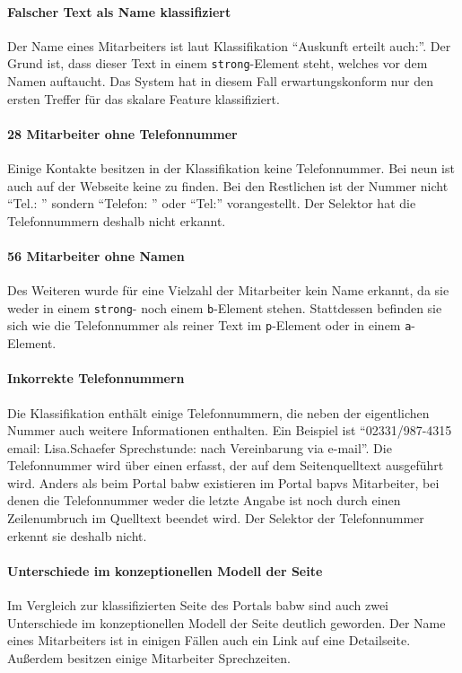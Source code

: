     \paragraph*{Falscher Text als Name klassifiziert}
    Der Name eines Mitarbeiters ist laut Klassifikation
    "`Auskunft erteilt auch:"'.
    Der Grund ist, dass dieser Text in einem \texttt{strong}-Element steht,
    welches vor dem Namen auftaucht.
    Das System hat in diesem Fall erwartungskonform nur den ersten
    Treffer für das skalare Feature klassifiziert.
        
    \paragraph*{28 Mitarbeiter ohne Telefonnummer}
    Einige Kontakte besitzen in der Klassifikation keine Telefonnummer.
    Bei neun ist auch auf der Webseite keine zu finden.
    Bei den Restlichen ist der Nummer nicht "`Tel.: "'
    sondern "`Telefon: "' oder "`Tel:"' vorangestellt.
    Der Selektor hat die Telefonnummern deshalb nicht erkannt.
    
    \paragraph*{56 Mitarbeiter ohne Namen}
    Des Weiteren wurde für eine Vielzahl der Mitarbeiter kein Name erkannt,
    da sie weder in einem \texttt{strong}- noch einem \texttt{b}-Element stehen.
    Stattdessen befinden sie sich wie die Telefonnummer als reiner Text im \texttt{p}-Element
    oder in einem \texttt{a}-Element.

    \paragraph*{Inkorrekte Telefonnummern}
    Die Klassifikation enthält einige Telefonnummern,
    die neben der eigentlichen Nummer auch weitere Informationen enthalten.
    Ein Beispiel ist "`02331/987-4315 email: Lisa.Schaefer Sprechstunde: nach Vereinbarung via e-mail"'.
    Die Telefonnummer wird über einen {\xpathSelector} erfasst,
    der auf dem Seitenquelltext ausgeführt wird.
    Anders als beim Portal \gls{babw} existieren im Portal \gls{bapvs} Mitarbeiter,
    bei denen die Telefonnummer weder die letzte Angabe ist
    noch durch einen Zeilenumbruch im Quelltext beendet wird.
    Der Selektor der Telefonnummer erkennt sie deshalb
    nicht.

    \paragraph*{Unterschiede im konzeptionellen Modell der Seite}
    Im Vergleich zur klassifizierten Seite des Portals \gls{babw}
    sind auch zwei Unterschiede im konzeptionellen Modell der Seite deutlich geworden.
    Der Name eines Mitarbeiters ist in einigen Fällen
    auch ein Link auf eine Detailseite.
    Außerdem besitzen einige Mitarbeiter Sprechzeiten.

